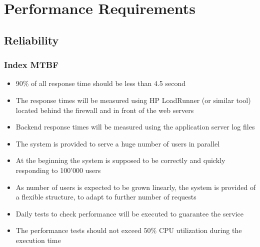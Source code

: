 \section{Performance Requirements}

\subsection{Reliability}
\subsubsection{Index MTBF}
\begin{itemize}
    \item 90\% of all response time should be less than 4.5 second
    \item The response times will be measured using HP LoadRunner (or similar tool) located behind the firewall and in front of the web servers
    \item Backend response times will be measured using the application server log files
    \item The system is provided to serve a huge number of users in parallel
    \item At the beginning the system is supposed to be correctly and quickly responding to 100'000 users
    \item As number of users is expected to be grown linearly, the system is provided of a flexible structure, to adapt to further number of requests
    \item Daily tests to check performance will be executed to guarantee the service
    \item The performance tests should not exceed 50\% CPU utilization during the execution time
\end{itemize}